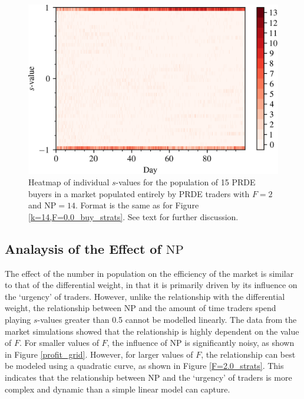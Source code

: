 \documentclass[conference]{IEEEtran}
\begin{document}
\begin{figure}[htbp]
    \centerline{\includegraphics[width=\columnwidth]{k=14,F=2.0_buy_strats.png}}
    \caption{
        Heatmap of individual $s$-values for the population of 15 PRDE buyers in a market populated entirely by PRDE traders with $F=2$ and $\mathrm{NP}=14$.
        Format is the same as for Figure \ref{k=14,F=0.0_buy_strats}.
        See text for further discussion.
    }
    \label{k=14,F=2.0_buy_strats}
\end{figure}

\subsection{Analaysis of the Effect of $\mathrm{NP}$}

The effect of the number in population on the efficiency of the market is similar to that of the differential weight, in that it is primarily driven by its influence on the `urgency' of traders.
However, unlike the relationship with the differential weight, the relationship between $\mathrm{NP}$ and the amount of time traders spend playing $s$-values greater than 0.5 cannot be modelled linearly.
The data from the market simulations showed that the relationship is highly dependent on the value of $F$.
For smaller values of $F$, the influence of $\mathrm{NP}$ is significantly noisy, as shown in Figure \ref{profit_grid}.
However, for larger values of $F$, the relationship can best be modeled using a quadratic curve, as shown in Figure  \ref{F=2.0_strats}.
This indicates that the relationship between $\mathrm{NP}$ and the `urgency' of traders is more complex and dynamic than a simple linear model can capture.
\end{document}
